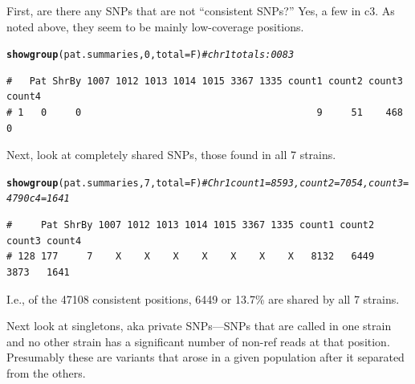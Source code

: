 \documentclass{article}\usepackage[]{graphicx}\usepackage[]{color}
\makeatletter
\newcommand{\hlnum}[1]{\textcolor[rgb]{0.686,0.059,0.569}{#1}}%
\newcommand{\hlcom}[1]{\textcolor[rgb]{0.678,0.584,0.686}{\textit{#1}}}%
\newcommand{\hlstd}[1]{\textcolor[rgb]{0.345,0.345,0.345}{#1}}%
\newcommand{\hlkwc}[1]{\textcolor[rgb]{0.333,0.667,0.333}{#1}}%
\newcommand{\hlkwd}[1]{\textcolor[rgb]{0.737,0.353,0.396}{\textbf{#1}}}%
\newenvironment{kframe}{%
 \def\at@end@of@kframe{}%
 \ifinner\ifhmode%
  \def\at@end@of@kframe{\end{minipage}}%
  \begin{minipage}{\columnwidth}%
 \fi\fi%
 \def\FrameCommand##1{\hskip\@totalleftmargin \hskip-\fboxsep
 \colorbox{shadecolor}{##1}\hskip-\fboxsep
     \hskip-\linewidth \hskip-\@totalleftmargin \hskip\columnwidth}%
 \MakeFramed {\advance\hsize-\width
   \@totalleftmargin\z@ \linewidth\hsize
   \@setminipage}}%
 {\par\unskip\endMakeFramed%
 \at@end@of@kframe}
\newenvironment{knitrout}{}{} %
\makeatother
\begin{document}
First, are there any SNPs that are not ``consistent SNPs?''  Yes, a few in c3.  As noted above, they seem to be mainly
low-coverage positions.

\begin{knitrout}\footnotesize
{}\color{fgcolor}\begin{kframe}
\begin{alltt}
\hlkwd{showgroup}\hlstd{(pat.summaries,}\hlnum{0}\hlstd{,}\hlkwc{total}\hlstd{=F)}  \hlcom{# chr1 totals: 0 0 83}
\end{alltt}
\begin{verbatim}
#   Pat ShrBy 1007 1012 1013 1014 1015 3367 1335 count1 count2 count3 count4
# 1   0     0                                         9     51    468      0
\end{verbatim}
\end{kframe}
\end{knitrout}

Next, look at completely shared SNPs, those found in all 7 strains.

\begin{knitrout}\footnotesize
{}\color{fgcolor}\begin{kframe}
\begin{alltt}
\hlkwd{showgroup}\hlstd{(pat.summaries,}\hlnum{7}\hlstd{,}\hlkwc{total}\hlstd{=F)} \hlcom{# Chr1 count1 = 8593, count2 = 7054, count3 = 4790 c4=1641}
\end{alltt}
\begin{verbatim}
#     Pat ShrBy 1007 1012 1013 1014 1015 3367 1335 count1 count2 count3 count4
# 128 177     7    X    X    X    X    X    X    X   8132   6449   3873   1641
\end{verbatim}
\end{kframe}
\end{knitrout}

I.e., of the
  47108
consistent positions,
  6449
or
  13.7\%
are shared by all 7 strains.

Next look at singletons, aka private SNPs---SNPs that are called in one strain and no other strain has a significant
number of non-ref reads at that position. Presumably these are variants that arose in a given population after it
separated from the others.
\end{document}
